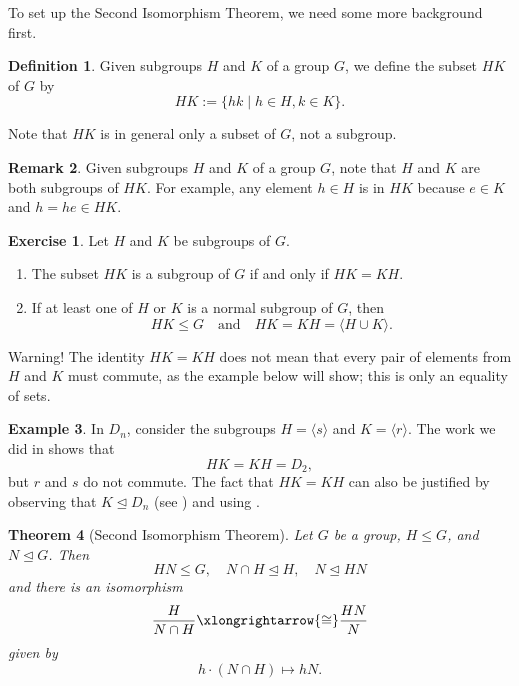 \documentclass[12pt]{report}
\newtheorem{theorem}{Theorem}[chapter]
\numberwithin{equation}{section}
\numberwithin{theorem}{chapter}
\theoremstyle{definition}
\newtheorem{definition}[theorem]{Definition}
\newtheorem{example}[theorem]{Example}
\newtheorem{exercise}{Exercise}
\newtheorem*{basic properties}{Basic Properties}
\newtheorem*{Important Remark}{Important Remark}
\newtheorem{remark}[theorem]{Remark}
\begin{document}
\vspace{1em}

To set up the Second Isomorphism Theorem, we need some more background first.

\begin{definition}
Given subgroups $H$ and $K$ of a group $G$, we define the subset $HK$ of $G$ by
$$HK := \{hk \mid h \in H, k\in K\}.$$	
\end{definition}

Note that $HK$ is in general only a subset of $G$, not a subgroup.


\begin{remark}
	Given subgroups $H$ and $K$ of a group $G$, note that $H$ and $K$ are both subgroups of $HK$. For example, any element $h \in H$ is in $HK$ because $e \in K$ and $h = he \in HK$.
\end{remark}


\begin{exercise}\label{exercise HK=KH}
Let $H$ and $K$ be subgroups of $G$.	
\begin{enumerate}[leftmargin=10pt]
\item The subset $HK$ is a subgroup of $G$ if and only if $HK=KH$.
\item If at least one of $H$ or $K$ is a normal subgroup of $G$, then 
$$HK\leq G \quad \textrm{and} \quad HK=KH=\langle H\cup K\rangle.$$
\end{enumerate}
\end{exercise}

Warning! The identity $HK=KH$ does not mean that every pair of elements from $H$ and $K$ must commute, as the example below will show; this is only an equality of sets.

\begin{example}
In $D_{n}$, consider the subgroups $H=\langle s\rangle$ and $K=\langle r\rangle$. The work we did in  shows that 
$$HK=KH=D_{2},$$ 
but $r$ and $s$ do not commute. The fact that $HK=KH$ can also be justified by observing that $K\trianglelefteq D_{n}$ (see ) and using .
\end{example}


\begin{theorem}[Second Isomorphism Theorem]\label{Second Isomorphism Theorem}
Let $G$ be a group, $H \leq G$, and $N \trianglelefteq G$. Then 
$$HN \leq G, \quad N \cap H \trianglelefteq H, \quad N \trianglelefteq HN$$ 
and there is an isomorphism
$$\frac{H}{N \cap H} \xlongrightarrow{\cong} \frac{HN}{N}$$
given by 
$$h \cdot (N \cap H) \mapsto hN.$$
\end{theorem}
\end{document}
